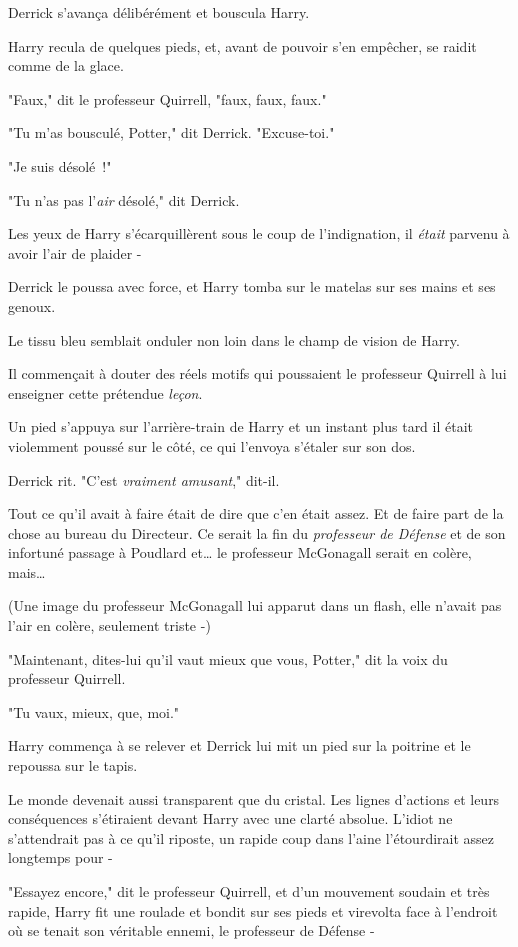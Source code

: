 Derrick s'avança délibérément et bouscula Harry.

Harry recula de quelques pieds, et, avant de pouvoir s'en empêcher, se raidit comme de la glace.

"Faux," dit le professeur Quirrell, "faux, faux, faux."

"Tu m'as bousculé, Potter," dit Derrick. "Excuse-toi."

"Je suis désolé~!"

"Tu n'as pas l'\emph{air} désolé," dit Derrick.

Les yeux de Harry s'écarquillèrent sous le coup de l'indignation, il \emph{était} parvenu à avoir l'air de plaider -

Derrick le poussa avec force, et Harry tomba sur le matelas sur ses mains et ses genoux.

Le tissu bleu semblait onduler non loin dans le champ de vision de Harry.

Il commençait à douter des réels motifs qui poussaient le professeur Quirrell à lui enseigner cette prétendue \emph{leçon}.

Un pied s'appuya sur l'arrière-train de Harry et un instant plus tard il était violemment poussé sur le côté, ce qui l'envoya s'étaler sur son dos.

Derrick rit. "C'est \emph{vraiment amusant}," dit-il.

Tout ce qu'il avait à faire était de dire que c'en était assez. Et de faire part de la chose au bureau du Directeur. Ce serait la fin du \emph{professeur de Défense} et de son infortuné passage à Poudlard et… le professeur McGonagall serait en colère, mais…

(Une image du professeur McGonagall lui apparut dans un flash, elle n'avait pas l'air en colère, seulement triste -)

"Maintenant, dites-lui qu'il vaut mieux que vous, Potter," dit la voix du professeur Quirrell.

"Tu vaux, mieux, que, moi."

Harry commença à se relever et Derrick lui mit un pied sur la poitrine et le repoussa sur le tapis.

Le monde devenait aussi transparent que du cristal. Les lignes d'actions et leurs conséquences s'étiraient devant Harry avec une clarté absolue. L'idiot ne s'attendrait pas à ce qu'il riposte, un rapide coup dans l'aine l'étourdirait assez longtemps pour -

"Essayez encore," dit le professeur Quirrell, et d'un mouvement soudain et très rapide, Harry fit une roulade et bondit sur ses pieds et virevolta face à l'endroit où se tenait son véritable ennemi, le professeur de Défense -

